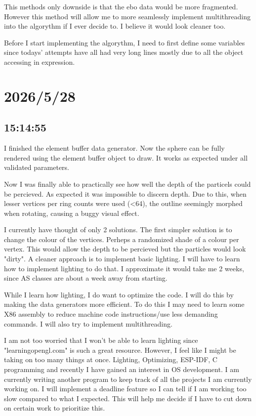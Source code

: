 \documentclass{article}
\begin{document}
This methods only downside is that the ebo data would be more fragmented. However this method will
allow me to more seamlessly implement multithreading into the algorythm if I ever decide to. I believe
it would look cleaner too.

Before I start implementing the algorythm, I need to first define some variables since todays' attempts
have all had very long lines mostly due to all the object accessing in expression.

\section*{2026/5/28}
\subsection*{15:14:55}
I finished the element buffer data generator. Now the sphere can be fully rendered using the element
buffer object to draw. It works as expected under all validated parameters.

Now I was finally able to practically see how well the depth of the particels could be percieved. As
expected it was impossible to discern depth. Due to this, when lesser vertices per ring counts were
used (<64), the outline seemingly morphed when rotating, causing a buggy visual effect. 

I currently have thought of only 2 solutions. The first simpler solution is to change the colour of
the vertices. Perheps a randomized shade of a colour per vertex. This would allow the depth to be
percieved but the particles would look "dirty". A cleaner approach is to implement basic lighting. 
I will have to learn how to implement lighting to do that. I approximate it would take me 2 weeks, 
since AS classes are about a week away from starting.

While I learn how lighting, I do want to optimize the code. I will do this by making the data
generators more efficient. To do this I may need to learn some X86 assembly to reduce machine code 
instructions/use less demanding commands. I will also try to implement multithreading.

I am not too worried that I won't be able to learn lighting since "learningopengl.com" is such a
great resource. However, I feel like I might be taking on too many things at once. Lighting, Optimizing,
ESP-IDF, C programming and recently I have gained an interest in OS development. I am currently 
writing another program to keep track of all the projects I am currently working on. I will implement
a deadline feature so I can tell if I am working too slow compared to what I expected. This will help
me decide if I have to cut down on certain work to prioritize this.
\end{document}
